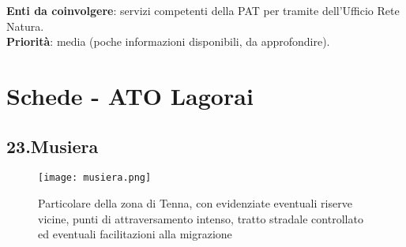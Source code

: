 \documentclass[11pt,a4paper,twoside]{memoir}
\begin{document}
\textbf{Enti da coinvolgere}: servizi competenti della PAT per tramite dell’Ufficio Rete Natura. \\
\textbf{Priorità}: media (poche informazioni disponibili, da approfondire). \\

\newpage
\section{Schede - ATO Lagorai}
\begin{tcolorbox}[breakable,colback=white,colframe=green,width=10cm]
\subsection{23.Musiera}
\end{tcolorbox}

\begin{figure}[H]
\label{fig:map_musiera}
\centering
  \texttt{[image: musiera.png]}
\caption{Particolare della zona di Tenna, con evidenziate eventuali riserve vicine, punti di attraversamento intenso, tratto stradale controllato ed eventuali facilitazioni alla migrazione}
\end{figure}
\end{document}
